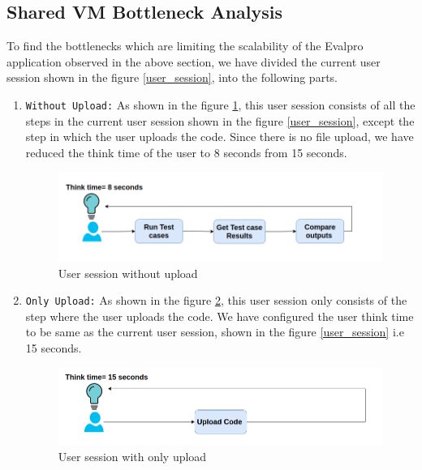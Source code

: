 \documentclass[sigconf]{acmart}
\begin{document}
\subsection{Shared VM Bottleneck Analysis}
To find the bottlenecks which are limiting the scalability of the Evalpro application observed in the above section, we have divided the current user session shown in the figure \ref{user_session}, into the following parts.
\begin{enumerate}
    \item {\texttt{Without Upload:}} As shown in the figure \ref{without_upload_session}, this user session consists of all the steps in the current user session shown in the figure  \ref{user_session}, except the step in which the user uploads the code. Since there is no file upload,  we have reduced the think time of the user to 8 seconds from 15 seconds.
    \begin{figure}[!htb]
  \centering
  \includegraphics[width=\linewidth]{Pictures/with_out_upload_session.png}
  \caption{User session without upload}
  \label{without_upload_session}
\end{figure}
    \item {\texttt{Only Upload:}} As shown in the figure \ref{upload_session}, this user session only consists of the step where the user uploads the code. We have configured the user think time to be same as the  current user session, shown in the figure \ref{user_session} i.e 15 seconds.
    \begin{figure}[!htb]
  \centering
  \includegraphics[width=\linewidth]{Pictures/only_upload_session.png}
  \caption{User session with only upload}
  \label{upload_session}
\end{figure}
\end{enumerate}
\end{document}
